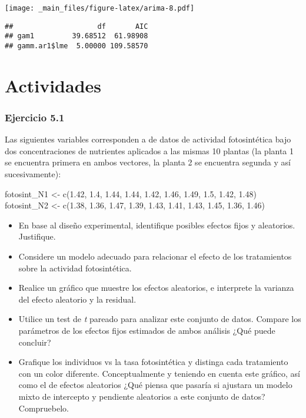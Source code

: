 \documentclass[
]{book}
\newenvironment{Shaded}{\begin{snugshade}}{\end{snugshade}}
\newcommand{\KeywordTok}[1]{\textcolor[rgb]{0.13,0.29,0.53}{\textbf{#1}}}
\newcommand{\NormalTok}[1]{#1}
\newcommand{\OperatorTok}[1]{\textcolor[rgb]{0.81,0.36,0.00}{\textbf{#1}}}
\begin{document}
\texttt{[image: \_main\_files/figure-latex/arima-8.pdf]}

\begin{Shaded}
\end{Shaded}

\begin{verbatim}
##                    df       AIC
## gam1         39.68512  61.98908
## gamm.ar1$lme  5.00000 109.58570
\end{verbatim}

\hypertarget{actividades-4}{%
\section{Actividades}\label{actividades-4}}

\hypertarget{ejercicio-5.1}{%
\subsubsection{Ejercicio 5.1}\label{ejercicio-5.1}}

Las siguientes variables corresponden a de datos de actividad fotosintética bajo dos concentraciones de nutrientes aplicados a las mismas 10 plantas (la planta 1 se encuentra primera en ambos vectores, la planta 2 se encuentra segunda y así sucesivamente):

fotosint\_N1 \textless- c(1.42, 1.4, 1.44, 1.44, 1.42, 1.46, 1.49, 1.5, 1.42, 1.48)
fotosint\_N2 \textless- c(1.38, 1.36, 1.47, 1.39, 1.43, 1.41, 1.43, 1.45, 1.36, 1.46)

\begin{itemize}
\item
  En base al diseño experimental, identifique posibles efectos fijos y aleatorios. Justifique.
\item
  Considere un modelo adecuado para relacionar el efecto de los tratamientos sobre la actividad fotosintética.
\item
  Realice un gráfico que muestre los efectos aleatorios, e interprete la varianza del efecto aleatorio y la residual.
\item
  Utilice un test de \emph{t} pareado para analizar este conjunto de datos. Compare los parámetros de los efectos fijos estimados de ambos análisis ¿Qué puede concluir?
\item
  Grafique los individuos vs la tasa fotosintética y distinga cada tratamiento con un color diferente. Conceptualmente y teniendo en cuenta este gráfico, así como el de efectos aleatorios ¿Qué piensa que pasaría si ajustara un modelo mixto de intercepto y pendiente aleatorios a este conjunto de datos? Compruebelo.
\end{itemize}
\end{document}
